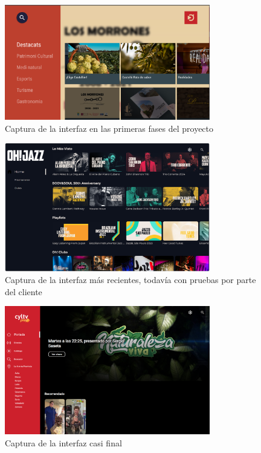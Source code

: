 \begin{figure}[H]
    \centering
    \includegraphics[width=0.8\textwidth]{imaxes/UX_inicios.png}
    \caption{Captura de la interfaz en las primeras fases del proyecto}
    \label{fig:UX_inicios}
\end{figure}
\begin{figure}[H]
    \centering
    \includegraphics[width=0.8\textwidth]{imaxes/Home_desp_OhJazz.png}
    \caption{Captura de la interfaz más recientes, todavía con pruebas por parte del cliente}
    \label{fig:Home_desp_OhJazz}
\end{figure}
\begin{figure}[H]
    \centering
    \includegraphics[width=0.8\textwidth]{imaxes/Home_CyLTv.png}
    \caption{Captura de la interfaz casi final}
    \label{fig:Home_CyLTv}
\end{figure}

